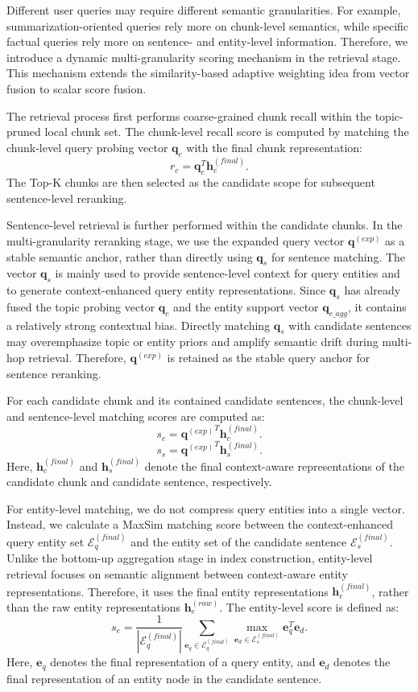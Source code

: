 \documentclass[preprint,12pt]{elsarticle}
\begin{document}
Different user queries may require different semantic granularities. For example, summarization-oriented queries rely more on chunk-level semantics, while specific factual queries rely more on sentence- and entity-level information. Therefore, we introduce a dynamic multi-granularity scoring mechanism in the retrieval stage. This mechanism extends the similarity-based adaptive weighting idea from vector fusion to scalar score fusion.

The retrieval process first performs coarse-grained chunk recall within the topic-pruned local chunk set. The chunk-level recall score is computed by matching the chunk-level query probing vector $\mathbf{q}_{c}$ with the final chunk representation:
\[
r_{c}
=
\mathbf{q}_{c}^{T}
\mathbf{h}_{c}^{(final)}.
\]
The Top-K chunks are then selected as the candidate scope for subsequent sentence-level reranking.

Sentence-level retrieval is further performed within the candidate chunks. In the multi-granularity reranking stage, we use the expanded query vector $\mathbf{q}^{(exp)}$ as a stable semantic anchor, rather than directly using $\mathbf{q}_{s}$ for sentence matching. The vector $\mathbf{q}_{s}$ is mainly used to provide sentence-level context for query entities and to generate context-enhanced query entity representations. Since $\mathbf{q}_{s}$ has already fused the topic probing vector $\mathbf{q}_{c}$ and the entity support vector $\mathbf{q}_{e\_agg}$, it contains a relatively strong contextual bias. Directly matching $\mathbf{q}_{s}$ with candidate sentences may overemphasize topic or entity priors and amplify semantic drift during multi-hop retrieval. Therefore, $\mathbf{q}^{(exp)}$ is retained as the stable query anchor for sentence reranking.

For each candidate chunk and its contained candidate sentences, the chunk-level and sentence-level matching scores are computed as:
\[
s_{c}
=
{\mathbf{q}^{(exp)}}^{T}
\mathbf{h}_{c}^{(final)}.
\]
\[
s_{s}
=
{\mathbf{q}^{(exp)}}^{T}
\mathbf{h}_{s}^{(final)}.
\]
Here, $\mathbf{h}_{c}^{(final)}$ and $\mathbf{h}_{s}^{(final)}$ denote the final context-aware representations of the candidate chunk and candidate sentence, respectively.

For entity-level matching, we do not compress query entities into a single vector. Instead, we calculate a MaxSim matching score between the context-enhanced query entity set $\mathcal{E}_{q}^{(final)}$ and the entity set of the candidate sentence $\mathcal{E}_{s}^{(final)}$. Unlike the bottom-up aggregation stage in index construction, entity-level retrieval focuses on semantic alignment between context-aware entity representations. Therefore, it uses the final entity representations $\mathbf{h}_{e}^{(final)}$, rather than the raw entity representations $\mathbf{h}_{e}^{(raw)}$. The entity-level score is defined as:
\[
s_{e}
=
\frac{1}{|\mathcal{E}_{q}^{(final)}|}
\sum_{\mathbf{e}_{q} \in \mathcal{E}_{q}^{(final)}}
\max_{\mathbf{e}_{d} \in \mathcal{E}_{s}^{(final)}}
\mathbf{e}_{q}^{T}
\mathbf{e}_{d}.
\]
Here, $\mathbf{e}_{q}$ denotes the final representation of a query entity, and $\mathbf{e}_{d}$ denotes the final representation of an entity node in the candidate sentence.
\end{document}
